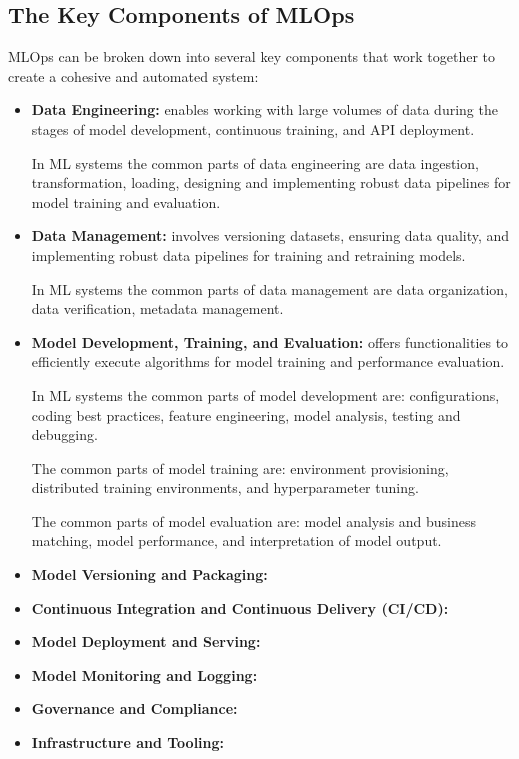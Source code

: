 \subsection{The Key Components of MLOps}
MLOps can be broken down into several key components that work
together to create a cohesive and automated system:
\begin{itemize}
    \item \textbf{Data Engineering:} enables working
    with large volumes of data during the stages of model development,
    continuous training, and API deployment.

    In ML systems the common parts of data engineering are data
    ingestion, transformation, loading, designing and implementing
    robust data pipelines for model training and evaluation.

    \item \textbf{Data Management:} involves versioning datasets,
    ensuring data quality, and implementing robust data pipelines for
    training and retraining models.

    In ML systems the common parts of data management are data organization,
    data verification, metadata management.

    \item \textbf{Model Development, Training, and Evaluation:} offers
    functionalities to efficiently execute algorithms for model training 
    and performance evaluation. 
    
    In ML systems the common parts of model development are: configurations,
    coding best practices, feature engineering, model analysis,
    testing and debugging.

    The common parts of model training are: environment provisioning,
    distributed training environments, and hyperparameter tuning.

    The common parts of model evaluation are: model analysis and business
    matching, model performance, and interpretation of model output.

    \item \textbf{Model Versioning and Packaging:} 
    

    
    \item \textbf{Continuous Integration and Continuous Delivery (CI/CD):}



    \item \textbf{Model Deployment and Serving:}
    


    \item \textbf{Model Monitoring and Logging:}
    


    \item \textbf{Governance and Compliance:}
    


    \item \textbf{Infrastructure and Tooling:}
    

\end{itemize}







